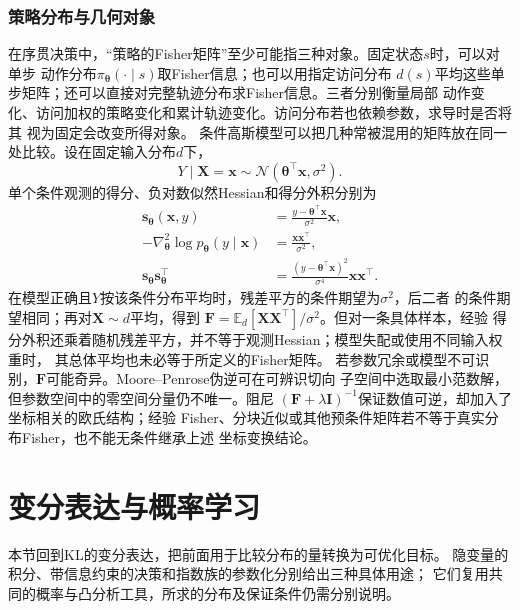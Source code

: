 \subsubsection{策略分布与几何对象}
在序贯决策中，“策略的Fisher矩阵”至少可能指三种对象。固定状态\(s\)时，可以对单步
动作分布\(\pi_{\bm{\theta}}(\cdot\mid s)\)取Fisher信息；也可以用指定访问分布
\(d(s)\)平均这些单步矩阵；还可以直接对完整轨迹分布求Fisher信息。三者分别衡量局部
动作变化、访问加权的策略变化和累计轨迹变化。访问分布若也依赖参数，求导时是否将其
视为固定会改变所得对象。
条件高斯模型可以把几种常被混用的矩阵放在同一处比较。设在固定输入分布\(d\)下，
\[
  Y\mid\bm{X}=\bm{x}
  \sim
  \mathcal{N}(\bm{\theta}^{\top}\bm{x},\sigma^2).
\]
单个条件观测的得分、负对数似然Hessian和得分外积分别为
\[
\begin{aligned}
  \bm{s}_{\bm{\theta}}(\bm{x},y)
  &=
  \frac{y-\bm{\theta}^{\top}\bm{x}}{\sigma^2}\bm{x},\\
  -\nabla_{\bm{\theta}}^2\log p_{\bm{\theta}}(y\mid\bm{x})
  &=
  \frac{\bm{x}\bm{x}^{\top}}{\sigma^2},\\
  \bm{s}_{\bm{\theta}}\bm{s}_{\bm{\theta}}^{\top}
  &=
  \frac{(y-\bm{\theta}^{\top}\bm{x})^2}{\sigma^4}
  \bm{x}\bm{x}^{\top}.
\end{aligned}
\]
在模型正确且\(Y\)按该条件分布平均时，残差平方的条件期望为\(\sigma^2\)，后二者
的条件期望相同；再对\(\bm X\sim d\)平均，得到
\(\bm F=\mathbb{E}_{d}[\bm X\bm X^{\top}]/\sigma^2\)。但对一条具体样本，经验
得分外积还乘着随机残差平方，并不等于观测Hessian；模型失配或使用不同输入权重时，
其总体平均也未必等于所定义的Fisher矩阵。
若参数冗余或模型不可识别，\(\bm{F}\)可能奇异。Moore--Penrose伪逆可在可辨识切向
子空间中选取最小范数解，但参数空间中的零空间分量仍不唯一。阻尼
\((\bm{F}+\lambda\bm{I})^{-1}\)保证数值可逆，却加入了坐标相关的欧氏结构；经验
Fisher、分块近似或其他预条件矩阵若不等于真实分布Fisher，也不能无条件继承上述
坐标变换结论。
\section{变分表达与概率学习}
\label{sec:information-variational-learning}

本节回到KL的变分表达，把前面用于比较分布的量转换为可优化目标。
隐变量的积分、带信息约束的决策和指数族的参数化分别给出三种具体用途；
它们复用共同的概率与凸分析工具，所求的分布及保证条件仍需分别说明。

